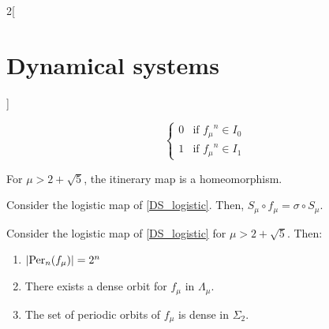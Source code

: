 \documentclass[../../../main_math.tex]{subfiles}
\begin{document}
\begin{multicols}{2}[\section{Dynamical systems}]
\begin{definition}
$$\begin{cases}
        0 & \text{if ${f_\mu}^n\in I_0$} \\
        1 & \text{if ${f_\mu}^n\in I_1$}
      \end{cases}
    $$
  \end{definition}
  \begin{proposition}
    For $\mu>2+\sqrt{5}$, the itinerary map is a homeomorphism.
  \end{proposition}
  \begin{theorem}
    Consider the logistic map of \cref{DS_logistic}. Then, $S_\mu\circ f_\mu=\sigma\circ S_\mu$.
  \end{theorem}
  \begin{corollary}
    Consider the logistic map of \cref{DS_logistic} for $\mu>2+\sqrt{5}$. Then:
    \begin{enumerate}
      \item $\abs{\operatorname{Per}_n(f_\mu)}=2^n$
      \item There exists a dense orbit for $f_\mu$ in $\Lambda_\mu$.
      \item The set of periodic orbits of $f_\mu$ is dense in $\Sigma_2$.
    \end{enumerate}
  \end{corollary}

\end{multicols}
\end{document}
